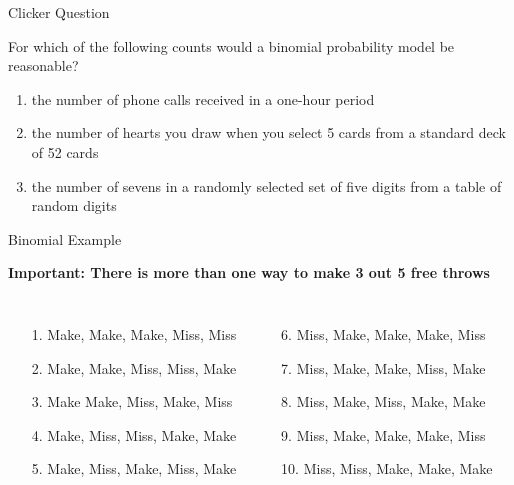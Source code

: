 \documentclass{beamer}
\begin{document}
\begin{frame}{Clicker Question}
	
	For which of the following counts would a binomial probability model be reasonable?
	
	\begin{enumerate}[label=(\alph*)]
		\item the number of phone calls received in a one-hour period
		\item the number of hearts you draw when you select 5 cards from a standard deck of 52 cards
		\item the number of sevens in a randomly selected set of five digits from a table of random digits
	\end{enumerate}
	
\end{frame}



\begin{frame}{Binomial Example}
	
	\textbf{Important: There is more than one way to make 3 out 5 free throws}
	\begin{columns}
		\footnotesize{
			\begin{enumerate}
				\item[1.] Make, Make, Make, Miss, Miss
				\item[2.] Make, Make, Miss, Miss, Make
				\item[3.] Make Make, Miss, Make, Miss
				\item[4.] Make, Miss, Miss, Make, Make
				\item[5.] Make, Miss, Make, Miss, Make
			\end{enumerate}}
		\footnotesize{
			\begin{enumerate}
				\item[6.] Miss, Make, Make, Make, Miss
				\item[7.] Miss, Make, Make, Miss, Make
				\item[8.] Miss, Make, Miss, Make, Make
				\item[9.] Miss, Make, Make, Make, Miss
				\item[10.] Miss, Miss, Make, Make, Make
			\end{enumerate}}
	\end{columns}
	
\end{frame}
\end{document}
